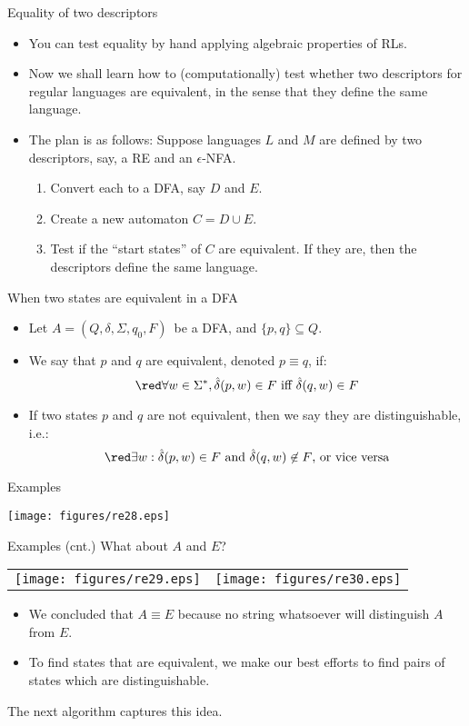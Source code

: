 \documentclass{prosper}%
\newcommand{\enfa}{{$\epsilon$-NFA}}
\newcommand{\autom}[1]{$#1 = (Q, \delta, \Sigma, q_0, F)$}
\begin{document}
\begin{slide}{Equality of two descriptors}
\begin{itemize}
\item You can test equality by hand  applying algebraic properties of RLs.
\item Now we shall learn how to (computationally) test whether two {\blue descriptors for regular languages} are {equivalent}, in the sense that they define the same language.
\item The plan is as follows: Suppose languages $L$ and $M$ are defined by two descriptors, say,  a RE and an \enfa.
\begin{enumerate}
\item Convert each to a DFA, say $D$ and $E$.
\item Create a new automaton $C=D \cup E$. 
\item Test if the ``start states'' of $C$ are {\blue equivalent}. If they are, then the descriptors define the same language.
\end{enumerate}
\end{itemize}
\end{slide}

\begin{slide}{When two states are equivalent in a DFA}
 \begin{itemize}
 \item Let \autom{A}\ be a DFA, and $\{p,q\} \subseteq Q$. 
 \item  We say that $p$ and $q$  are {\blue equivalent}, denoted $p\equiv q$,  if:
 \[
{\red \forall w}\in\Sigma^*,\hat{\delta}(p,w)\in F \mbox{ iff } \hat{\delta}(q,w)\in F
\]
\item If two states $p$ and $q$ are not equivalent, then we say they are {\blue distinguishable}, i.e.:
\[
{\red \exists w}:\hat{\delta}(p,w) \in F\mbox{ and }\hat{\delta}(q,w) \not\in F\mbox{, or vice versa}
\]


\end{itemize}
\end{slide}



\begin{slide}{Examples}
\begin{center}
\texttt{[image: figures/re28.eps]}
\end{center}
\end{slide}

\begin{slide}{Examples (cnt.)}
What about $A$ and $E$?
\begin{tabular}{ll}
\texttt{[image: figures/re29.eps]}
&
\texttt{[image: figures/re30.eps]}
\end{tabular}
\begin{itemize}
\item We concluded that $A\equiv E$ because no string whatsoever will distinguish $A$ from $E$.
\item To find states that are equivalent, we make our best efforts to find pairs of states which are distinguishable.
\end{itemize}
The next algorithm captures this idea.
\end{slide}
\end{document}
